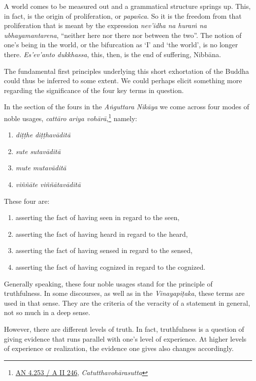 A world comes to be measured out and a grammatical structure springs up. This, in fact, is the origin of proliferation, or \emph{papañca}. So it is the freedom from that proliferation that is meant by the expression \emph{nev'idha na huraṁ na ubhayamantarena}, ``neither here nor there nor between the two''. The notion of one's being in the world, or the bifurcation as `I' and `the world', is no longer there. \emph{Es'ev'anto dukkhassa}, this, then, is the end of suffering, Nibbāna.

The fundamental first principles underlying this short exhortation of the Buddha could thus be inferred to some extent. We could perhaps elicit something more regarding the significance of the four key terms in question.

In the section of the fours in the \emph{Aṅguttara Nikāya} we come across four modes of noble usages, \emph{cattāro ariya vohārā},\footnote{\href{https://suttacentral.net/an4.253/pli/ms}{AN 4.253 / A II 246}, \emph{Catutthavohārasutta}} namely:

\begin{enumerate}
\def\labelenumi{\arabic{enumi}.}
\tightlist
\item
  \emph{diṭṭhe diṭṭhavāditā}
\item
  \emph{sute sutavāditā}
\item
  \emph{mute mutavāditā}
\item
  \emph{viññāte viññātavāditā}
\end{enumerate}

These four are:

\begin{enumerate}
\def\labelenumi{\arabic{enumi}.}
\tightlist
\item
  asserting the fact of having seen in regard to the seen,
\item
  asserting the fact of having heard in regard to the heard,
\item
  asserting the fact of having sensed in regard to the sensed,
\item
  asserting the fact of having cognized in regard to the cognized.
\end{enumerate}

Generally speaking, these four noble usages stand for the principle of truthfulness. In some discourses, as well as in the \emph{Vinayapiṭaka}, these terms are used in that sense. They are the criteria of the veracity of a statement in general, not so much in a deep sense.

However, there are different levels of truth. In fact, truthfulness is a question of giving evidence that runs parallel with one's level of experience. At higher levels of experience or realization, the evidence one gives also changes accordingly.


